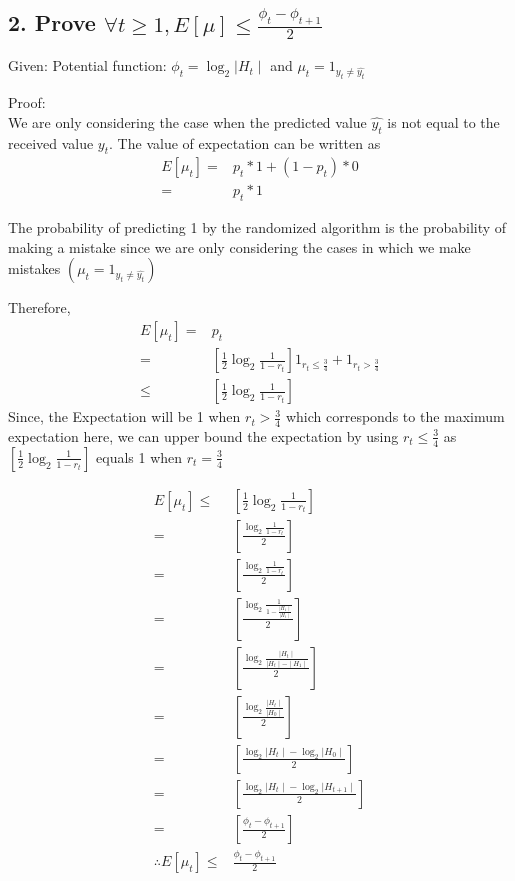 \documentclass{article}
\begin{document}
\subsection*{2. Prove \( \forall t \geq 1, E[\mu] \le \frac{\phi_{t} - \phi_{t+1}}{2} \)}
\begin{description}
  \item{Given:} Potential function: \( \phi_{t} = \log_2{\mid H_{t} \mid} \) and \( \mu_{t} = 1_{y_{t} \neq \hat{y_{t}} } \)
  \item{Proof:} \\
    We are only considering the case when the predicted value \( \hat{y_{t}} \) is not equal to the received value \( y_{t} \).
    The value of expectation can be written as 
    \begin{align*}
      E[\mu_{t}] =& p_{t}*1 + (1 - p_{t})*0 \\
      =& p_{t}*1
    \end{align*}

    The probability of predicting 1 by the randomized algorithm is the probability of making a mistake since we are only considering the cases in which we make mistakes \(  ( \mu_{t} = 1_{y_{t} \neq \hat{y_{t}}})\)

    Therefore, 
    \begin{align*}
      E[\mu_{t}] =& p_{t}\\
      =& [\frac{1}{2} \log_2{\frac{1}{1 - r_{t}}} ] 1_{r_{t} \le \frac{3}{4}} + 1_{r_{t} > \frac{3}{4}} \\
      \le & [\frac{1}{2} \log_2{\frac{1}{1 - r_{t}}}]
    \end{align*}
    Since, the Expectation will be 1 when \( r_{t} > \frac{3}{4} \) which corresponds to the maximum expectation here, we can upper bound the expectation by using \( r_{t} \le \frac{3}{4} \) as \( [\frac{1}{2} \log_2{\frac{1}{1 - r_{t}}} ] \) equals 1 when \( r_{t} = \frac{3}{4} \)

    \begin{align*}
      E[\mu_{t}] \le & [\frac{1}{2} \log_2{\frac{1}{1 - r_{t}}}] \\
      = & [ \frac{\log_2{\frac{1}{1 - r_{t}}}}{2}] \\
      = & [ \frac{\log_2{\frac{1}{1 - r_{t}}}}{2}] \\
      = & [ \frac{\log_2{\frac{1}{1 - \frac{\mid H_{1} \mid}{\mid H_{t} \mid}}}}{2}] \\
      = & [ \frac{\log_2{\frac{\mid H_{t} \mid}{\mid H_{t} \mid - \mid H_{1} \mid}}}{2}] \\
      = & [ \frac{\log_2{\frac{\mid H_{t} \mid}{\mid H_{0} \mid}}}{2}] \\
      = & [ \frac{\log_2{\mid H_{t} \mid} - \log_2{\mid H_{0} \mid}}{2}] \\
      = & [ \frac{\log_2{\mid H_{t} \mid} - \log_2{\mid H_{t+1} \mid}}{2}] \\
      = & [ \frac{\phi_{t} - \phi_{t+1}}{2}] \\
      \therefore E[\mu_{t}] \le &  \frac{\phi_{t} - \phi_{t+1}}{2}
    \end{align*}
\end{description}
\end{document}
